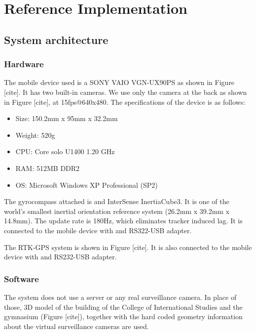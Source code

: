 \chapter{Reference Implementation}
\label{Chapter4}

\section{System architecture}

\subsection{Hardware}

The mobile device used is a SONY VAIO VGN-UX90PS as shown in Figure [cite]. It has two built-in cameras. We use only the camera at the back as shown in Figure [cite], at 15fps@640x480. The specifications of the device is as follows:

\begin{itemize}
\item Size: 150.2mm x 95mm x 32.2mm
\item Weight: 520g
\item CPU: Core solo U1400 1.20 GHz
\item RAM: 512MB DDR2
\item OS: Microsoft Windows XP Professional (SP2)
\end{itemize}

The gyrocompass attached is and InterSense InertiaCube3. It is one of the world's smallest inertial orientation reference system (26.2mm x 39.2mm x 14.8mm). The update rate is 180Hz, which eliminates tracker induced lag. It is connected to the mobile device with and RS322-USB adapter.

The RTK-GPS system is shown in Figure [cite]. It is also connected to the mobile device with and RS232-USB adapter.

\subsection{Software}

The system does not use a server or any real surveillance camera. In place of those, 3D model of the building of the College of International Studies and the gymnasium (Figure [cite]), together with the hard coded geometry information about the virtual surveillance cameras are used.

